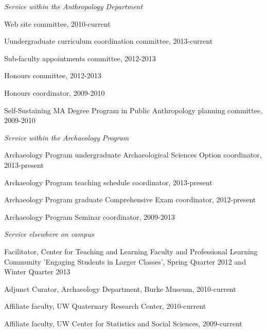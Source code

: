 
\medskip

\noindent\emph{Service within the Anthropology Department \vspace{0.01in}}

\medskip

\ind Web site committee, 2010-current

\ind Uundergraduate curriculum coordination committee, 2013-current

\ind Sub-faculty appointments committee, 2012-2013

\ind Honours committee, 2012-2013

\ind Honours coordinator, 2009-2010

\ind Self-Sustaining MA Degree Program in Public Anthropology planning committee, 2009-2010

\medskip

\noindent\emph{Service within the Archaeology Program \vspace{0.01in}}

\medskip

\ind Archaeology Program undergraduate Archaeological Sciences Option coordinator, 2013-present

\ind Archaeology Program teaching schedule coordinator, 2013-present

\ind Archaeology Program graduate Comprehensive Exam coordinator, 2012-present

\ind Archaeology Program Seminar coordinator, 2009-2013

 \medskip
 
 \newpage

\noindent\emph{Service elsewhere on campus\vspace{0.01in}}

\medskip

\ind Facilitator, Center for Teaching and Learning Faculty and Professional Learning Community 'Engaging Students in Larger Classes', Spring Quarter 2012 and Winter Quarter 2013

\ind Adjunct Curator, Archaeology Department, Burke Museum, 2010-current

\ind Affiliate faculty, UW Quaternary Research Center, 2010-current

\ind Affiliate faculty, UW Center for Statistics and Social Sciences, 2009-current

